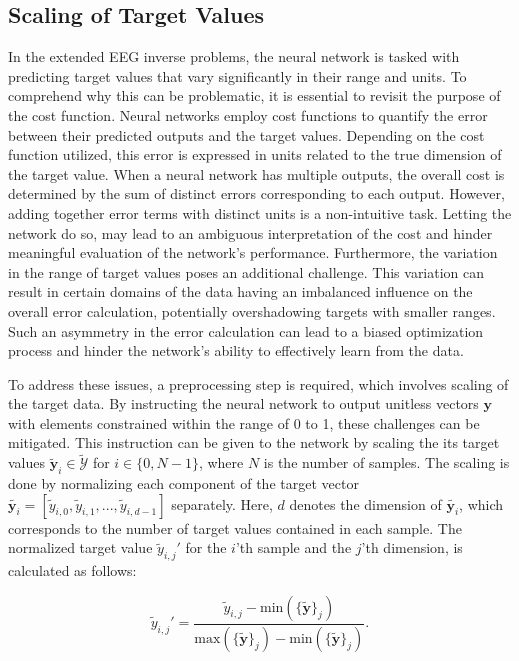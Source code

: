 \documentclass[a4paper, UKenglish, 11pt]{uiomaster}
\begin{document}
\subsection{Scaling of Target Values}
In the extended EEG inverse problems, the neural network is tasked with predicting target values that vary significantly in their range and units. To comprehend why this can be problematic, it is essential to revisit the purpose of the cost function. Neural networks employ cost functions to quantify the error between their predicted outputs and the target values. Depending on the cost function utilized, this error is expressed in units related to the true dimension of the target value. When a neural network has multiple outputs, the overall cost is determined by the sum of distinct errors corresponding to each output. However, adding together error terms with distinct units is a non-intuitive task. Letting the network do so, may lead to an ambiguous interpretation of the cost and hinder meaningful evaluation of the network's performance. Furthermore, the variation in the range of target values poses an additional challenge. This variation can result in certain domains of the data having an imbalanced influence on the overall error calculation, potentially overshadowing targets with smaller ranges. Such an asymmetry in the error calculation can lead to a biased optimization process and hinder the network's ability to effectively learn from the data.

To address these issues, a preprocessing step is required, which involves scaling of the target data. By instructing the neural network to output unitless vectors $\textbf{{y}}$ with elements constrained within the range of 0 to 1, these challenges can be mitigated. This instruction can be given to the network by scaling the its target values $\mathbf{\tilde{y}}_i \in \tilde{\mathcal{Y}}$ for $i \in \{0, N-1\}$, where $N$ is the number of samples. The scaling is done by normalizing each component of the target vector $\tilde{\mathbf{y}_i} = [\tilde{y}_{i,0}, \tilde{y}_{i,1}, ..., \tilde{y}_{i,d-1}]$ separately. Here, $d$ denotes the dimension of $\tilde{\mathbf{y}_i}$, which corresponds to the number of target values contained in each sample. The normalized target value $\tilde{y}_{i,j}'$ for the $i$'th sample and the $j$'th dimension, is calculated as follows:

\begin{equation}
\tilde{y}_{i,j}' = \frac{\tilde{y}_{i,j} - \text{min}(\{\tilde{\mathbf{y}}\}_j)}{\text{max}(\{\tilde{\mathbf{y}}\}_j) - \text{min}(\{\tilde{\mathbf{y}}\}_j)}.
\label{eq:scale_target}
\end{equation}
\end{document}
